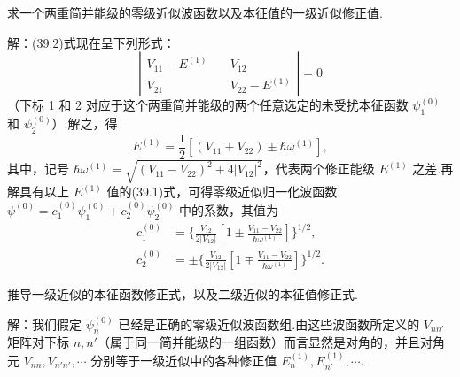 \begin{xiti}

\quad 求一个两重简并能级的零级近似波函数以及本征值的一级近似修正值.

解：(39.2)式现在呈下列形式：
\begin{equation*}
  \left|\begin{array}{cc}
    V_{11}-E^{(1)} & \quad V_{12}\\
    V_{21} & \quad V_{22}-E^{(1)}
  \end{array}\right|=0
\end{equation*}
（下标 1 和 2 对应于这个两重简并能级的两个任意选定的未受扰本征函数 $\psi_1^{(0)}$ 和 $\psi_2^{(0)}$）.解之，得
\setcounter{equation}{0}\renewcommand{\theequation}{\arabic{equation}}%
\begin{equation}
  E^{(1)}=\frac{1}{2}\left[\left(V_{11}+V_{22}\right)\pm\hbar\omega^{(1)}\right],
\end{equation}
其中，记号 $\hbar\omega^{(1)}=\sqrt{\left(V_{11}-V_{22}\right)^2+4|V_{12}|^2}$，代表两个修正能级 $E^{(1)}$ 之差.再解具有以上 $E^{(1)}$ 值的(39.1)式，可得零级近似归一化波函数 $\psi^{(0)}=c_1^{(0)}\psi_1^{(0)}+c_2^{(0)}\psi_2^{(0)}$ 中的系数，其值为
\begin{equation}
\begin{aligned}
  c_1^{(0)}&=\biggl\{\frac{V_{12}}{2|V_{12}|}
  \left[1\pm\frac{V_{11}-V_{22}}{\hbar\omega^{(1)}}\right]\biggr\}^{1/2},\\
  c_2^{(0)}&=\pm\biggl\{\frac{V_{12}}{2|V_{12}|}
  \left[1\mp\frac{V_{11}-V_{22}}{\hbar\omega^{(1)}}\right]\biggr\}^{1/2}.
\end{aligned}
\end{equation}

\quad 推导一级近似的本征函数修正式，以及二级近似的本征值修正式.

解：我们假定 $\psi_n^{(0)}$ 已经是正确的零级近似波函数组.由这些波函数所定义的 $V_{nn'}$ 矩阵对下标 $n,n'$（属于同一简并能级的一组函数）而言显然是对角的，并且对角元 $V_{nn},V_{n'n'},\cdots$ 分别等于一级近似中的各种修正值 $E_n^{(1)},E_{n'}^{(1)},\cdots$.


\end{xiti}

